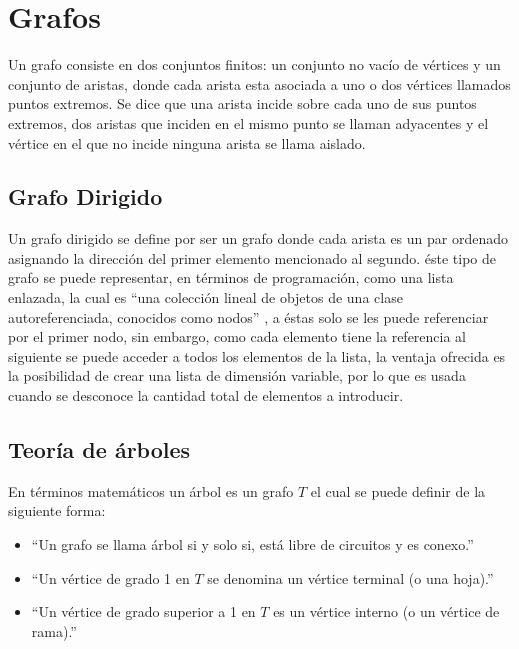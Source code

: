 
\section{Grafos}
Un grafo consiste en dos conjuntos finitos: un conjunto no vac\'io de
 v\'ertices y un conjunto de aristas, donde cada arista esta asociada 
 a uno o dos v\'ertices llamados puntos extremos\cite{SUSANNAS.EPP2012}. 
 Se dice que una arista incide sobre cada uno de sus puntos extremos, 
 dos aristas que inciden en el mismo punto se llaman adyacentes y el 
 v\'ertice en el que no incide ninguna arista se llama 
 aislado\cite{SUSANNAS.EPP2012}.


\subsection{Grafo Dirigido}
Un grafo dirigido se define por ser un grafo donde cada arista es un 
 par ordenado asignando la direcci\'on del primer elemento mencionado 
 al segundo\cite{SUSANNAS.EPP2012}. \'este tipo de grafo se puede 
 representar, en t\'erminos de programaci\'on,  como una lista enlazada, 
 la cual es ``una colecci\'on lineal de objetos de una clase autoreferenciada, 
 conocidos como nodos'' \cite{deitel2008java}, a \'estas solo se les puede 
 referenciar por el primer nodo, sin embargo, como cada elemento tiene la 
 referencia al siguiente se puede acceder a todos los elementos de la lista, 
 la ventaja ofrecida es la posibilidad de crear una lista de dimensi\'on 
 variable, por lo que es usada cuando se desconoce la cantidad total de 
 elementos a introducir\cite{deitel2008java}.


\subsection{Teor\'ia de \'arboles}
En t\'erminos matem\'aticos un \'arbol es un grafo $T$ el cual se puede definir de
 la siguiente forma\cite{SUSANNAS.EPP2012}:

\begin{itemize}
	\item ``Un grafo se llama \'arbol si y solo si, est\'a libre de circuitos y
	 es conexo.''
	\item ``Un v\'ertice de grado 1 en $T$ se denomina un v\'ertice terminal (o
	 una hoja).''
	\item ``Un v\'ertice de grado superior a 1 en $T$ es un v\'ertice interno (o
	 un v\'ertice de rama).''
\end{itemize}

